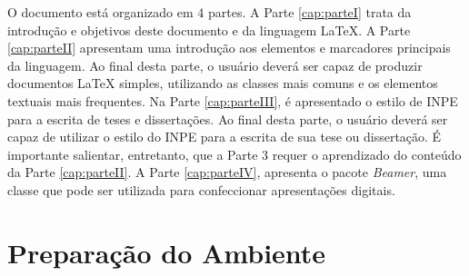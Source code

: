 


O documento está organizado em 4 partes. A Parte \ref{cap:parteI} trata da introdução e objetivos deste documento e da linguagem \LaTeX{}. A Parte \ref{cap:parteII} apresentam uma introdução aos elementos e marcadores principais da linguagem. Ao final desta parte, o usuário deverá ser capaz de produzir documentos \LaTeX{} simples, utilizando as classes mais comuns e os elementos textuais mais frequentes. Na Parte \ref{cap:parteIII}, é apresentado o estilo de INPE para a escrita de teses e dissertações. Ao final desta parte, o usuário deverá ser capaz de utilizar o estilo do INPE para a escrita de sua tese ou dissertação. É importante salientar, entretanto, que a Parte 3 requer o aprendizado do conteúdo da Parte \ref{cap:parteII}. A Parte \ref{cap:parteIV}, apresenta o pacote \textit{Beamer}, uma classe que pode ser utilizada para confeccionar apresentações digitais.

\section{Preparação do Ambiente}
\label{sec:prepara}

